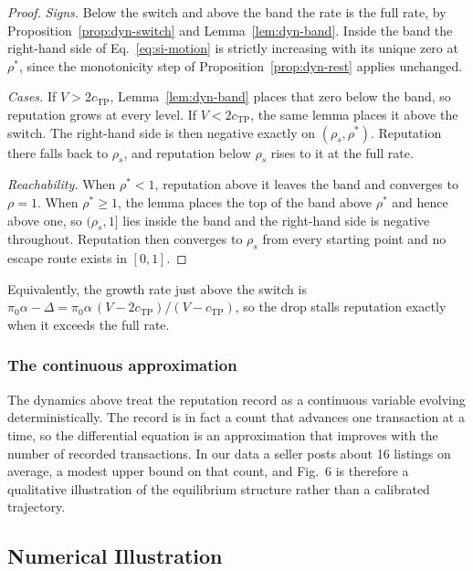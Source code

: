 \documentclass[11pt,letterpaper]{article}
\theoremstyle{definition}
\begin{document}
\begin{proof}
\textit{Signs.} Below the switch and above the band the rate is the full rate,
by Proposition~\ref{prop:dyn-switch} and Lemma~\ref{lem:dyn-band}. Inside the
band the right-hand side of Eq.~\ref{eq:si-motion} is strictly increasing with
its unique zero at $\rho^{*}$, since the monotonicity step of
Proposition~\ref{prop:dyn-rest} applies unchanged.

\textit{Cases.} If $V > 2c_{\text{TP}}$, Lemma~\ref{lem:dyn-band} places that
zero below the band, so reputation grows at every level. If
$V < 2c_{\text{TP}}$, the same lemma places it above the switch. The right-hand
side is then negative exactly on $(\rho_s, \rho^{*})$. Reputation there falls back to $\rho_s$, and reputation below $\rho_s$ rises to it at the full rate.

\textit{Reachability.} When $\rho^{*} < 1$, reputation above it leaves the band and converges to $\rho = 1$. When $\rho^{*} \geq 1$, the lemma places the top of the
band above $\rho^{*}$ and hence above one, so $(\rho_s, 1]$ lies inside the band
and the right-hand side is negative throughout. Reputation then converges to $\rho_s$ from every starting point and no escape route exists in $[0, 1]$.
\end{proof}

Equivalently, the growth rate just above the switch is
$\pi_0\alpha - \Delta = \pi_0\alpha\,(V - 2c_{\text{TP}})/(V - c_{\text{TP}})$,
so the drop stalls reputation exactly when it exceeds the full rate.

\subsubsection*{The continuous approximation}

The dynamics above treat the reputation record as a continuous variable evolving deterministically. The record is in fact a count that advances one transaction at a time, so the differential equation is an approximation that improves with the number of recorded transactions. In our data a seller posts about 16 listings on average, a modest upper bound on that count, and Fig.~6 is therefore a qualitative illustration of the equilibrium structure rather than a calibrated trajectory.

\subsection{Numerical Illustration}\label{subsec:th-E}
\end{document}
